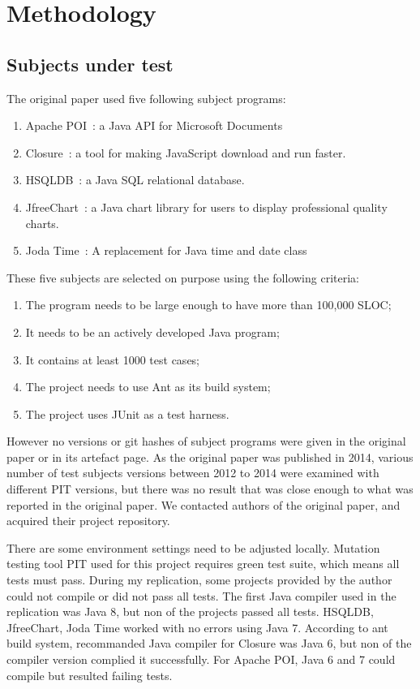 \section{Methodology}
\subsection{Subjects under test}
The original paper used five following subject programs: 
\begin{enumerate}
	\item Apache POI~\cite{apachepoi}: a Java API for Microsoft Documents
	\item Closure~\cite{closure}: a tool for making JavaScript download and run faster.
	\item HSQLDB~\cite{hsqldb}: a Java SQL relational database.
	\item JfreeChart~\cite{jfreechart}: a Java chart library for users to display professional quality charts.
	\item Joda Time~\cite{jodatime}: A replacement for Java time and date class
\end{enumerate}

These five subjects are selected on purpose using the following criteria:
\begin{enumerate}
	\item The program needs to be large enough to have more than 100,000 SLOC;
	\item It needs to be an actively developed Java program;
	\item It contains at least 1000 test cases;
	\item The project needs to use Ant as its build system;
	\item The project uses JUnit as a test harness.
\end{enumerate}

However no versions or git hashes of subject programs were given in the original paper or in its artefact page. As the original paper was published in 2014, various number of test subjects versions between 2012 to 2014 were examined with different PIT versions, but there was no result that was close enough to what was reported in the original paper. We contacted authors of the original paper, and acquired their project repository.  

There are some environment settings need to be adjusted locally. Mutation testing tool PIT used for this project requires green test suite, which means all tests must pass. During my replication, some projects provided by the author could not compile or did not pass all tests. The first Java compiler used in the replication was Java 8, but non of the projects passed all tests. HSQLDB, JfreeChart, Joda Time worked with no errors using Java 7. According to ant build system, recommanded Java compiler for Closure was Java 6, but non of the compiler version complied it successfully. For Apache POI, Java 6 and 7 could compile but resulted failing tests.

